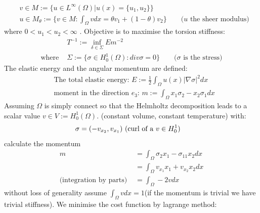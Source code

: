 \documentclass[a4paper,12pt,oneside,fleqn]{book}
\theoremstyle{definition}
\theoremstyle{remark}
\begin{document}
\begin{align*}
	&v \in M:= \bigg\{ u \in L^\infty(\Omega)| u(x) = \{u_1, u_2\} \bigg\}\\
	&u \in M_\theta:= \bigg\{ v \in M: \int_\Omega vdx= \theta v_1 + (1 - \theta) v_2 \bigg\} \qquad \text{($u$ the sheer modulus)}
\end{align*}
where $0 < u_1 < u_2 < \infty$ .
Objective is to maximise the torsion stiffness:
\begin{align*}
	&T^{-1}:= \inf_{\delta \in \Sigma} Em^{-2}\\
	\text{where } &\Sigma:= \{\sigma \in H_0^1(\Omega): div \sigma = 0\} \qquad \text{($\sigma$ is the stress)}
\end{align*}
The elastic energy and the angular momentum are defined:
\begin{align*}
	&\text{The total elastic energy: } E:= \frac{1}{2}\int_\Omega u(x) |\nabla \sigma|^2dx  \\
	&\text{moment in the direction $e_3$: } m := \int_\Omega x_1 \sigma_2 - x_2 \sigma_1 dx 
\end{align*}
Assuming $\Omega$ is simply connect so that the Helmholtz decomposition leads to a scalar value $v  \in V := H_0^1(\Omega) $. (constant volume, constant temperature) with:
\begin{align*}
	\sigma &= (- v_{x_2}, v_{x_1}) \text{ (curl of a $ v \in H^1_0$)}
\end{align*}
calculate the momentum
\begin{align*}
	m &= \int_\Omega \sigma_2 x_1 - \sigma_11 x_2  dx \\
	&= \int_\Omega v_{x_1} x_1 + v_{x_2} x_2  dx \\
	\text{(integration by parts) }
	&= \int_\Omega -2 vdx
\end{align*}
without loss of generality assume $\int_\Omega v dx = 1$(if the momentum is trivial we have trivial stiffness). We minimise the cost function by lagrange method:
\end{document}
